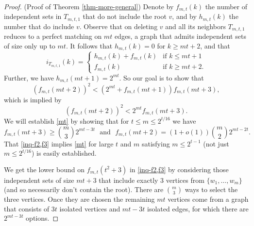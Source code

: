 \documentclass[12pt]{article}
\theoremstyle{definition}
\theoremstyle{definition}
\theoremstyle{definition}
\theoremstyle{definition}
\theoremstyle{definition}
\theoremstyle{definition}
\theoremstyle{definition}
\theoremstyle{definition}
\theoremstyle{remark}
\begin{document}
\begin{proof} (Proof of Theorem \ref{thm-more-general})
Denote by $f_{m,t}(k)$ the number of independent sets in $T_{m,t,1}$ that do not include the root $v$, and by $h_{m,t}(k)$ the number that do include $v$. Observe that on deleting $v$ and all its neighbors $T_{m,t,1}$ reduces to a perfect matching on $mt$ edges, a graph that admits independent sets of size only up to $mt$. It follows that $h_{m,t}(k)=0$ for $k \geq mt+2$, and that 
\begin{equation} \label{split}
i_{T_{m,t,1}}(k) = \left\{
\begin{array}{rl}
h_{m,t}(k) + f_{m,t}(k) & \mbox{if $k \leq mt+1$} \\
f_{m,t}(k) & \mbox{if $k \geq mt+2$}.
\end{array}
\right.
\end{equation}
Further, we have $h_{m,t}(mt+1)=2^{mt}$. So our goal is to show that
$$
\left(f_{m,t}(mt+2)\right)^2 < (2^{mt} + f_{m,t}(mt+1))f_{m,t}(mt+3),
$$
which is implied by 
\begin{equation} \label{mt}
\left(f_{m,t}(mt+2)\right)^2 < 2^{mt}f_{m,t}(mt+3).
\end{equation}
We will establish \eqref{mt} by showing that for $t \leq m \leq 2^{t/16}$ we have
\begin{equation} \label{inq-f2,f3}
f_{m,t}(mt+3) \geq \binom{m}{3}2^{mt-3t}~~~\mbox{and}~~~f_{m,t}(mt+2) = \left(1+o(1)\right) \binom{m}{2}2^{mt-2t}.
\end{equation}
That \eqref{inq-f2,f3} implies \eqref{mt} for large $t$ and $m$  satisfying $m \leq 2^{t-1}$ (not just $m \leq 2^{t/16}$) is easily established.  

\smallskip

We get the lower bound on $f_{m,t}(t^2+3)$ in \eqref{inq-f2,f3} by considering those independent sets of size $mt+3$ that include exactly $3$ vertices from $\{w_1, \ldots, w_m\}$ (and so necessarily don't contain the root). There are $\binom{m}{3}$ ways to select the three vertices. Once they are chosen the remaining $mt$ vertices come from a graph that consists of $3t$ isolated vertices and $mt-3t$ isolated edges, for which there are $2^{mt-3t}$ options.


\end{proof}
\end{document}
